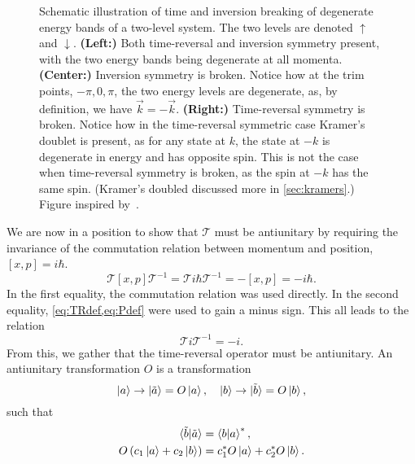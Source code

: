 \begin{figure}[h]
  \caption{Schematic illustration of time and inversion breaking of degenerate energy bands of a two-level system.
    The  two levels are denoted $\uparrow$ and $\downarrow$.
    \textbf{(Left:)} Both time-reversal and inversion symmetry present, with the two energy bands being degenerate at all momenta.
    \textbf{(Center:)} Inversion symmetry is broken. Notice how at the \gls{trim} points, $-\pi, 0, \pi$, the two energy levels are degenerate, as, by definition, we have $\vec{k} = -\vec{k}$.
    \textbf{(Right:)} Time-reversal symmetry is broken.
    Notice how in the time-reversal symmetric case Kramer's doublet is present, as for any state at $k$, the state at $-k$ is degenerate  in energy and has opposite spin.
    This is not the case when time-reversal symmetry is broken, as the spin at  $-k$ has the same spin.
    (Kramer's doubled discussed more in \cref{sec:kramers}.)
    Figure inspired by~\textcite{ramazashviliZeemanSpinorbitCoupling2019}.
  }
  \label{fig:symmetry_considerations}
\end{figure}

We are now in a position to show that $\mathcal{T}$ must be antiunitary by requiring the invariance of the commutation relation between momentum and position, $[x, p] = i\hbar$.
\begin{equation}
  \mathcal{T} [x, p] \mathcal{T}^{-1} = \mathcal{T} i\hbar \mathcal{T}^{-1} = - [x, p] = -i\hbar.
\end{equation}
In the first equality, the commutation relation was used directly.
In the second equality, \cref{eq:TRdef,eq:Pdef} were used to gain a minus sign.
This all leads to the relation
\begin{equation}
  \mathcal{T} i \mathcal{T}^{-1} = -i.
\end{equation}
From this, we gather that the time-reversal operator must be antiunitary.
An antiunitary transformation \( O \) is a transformation
$$
\ket{a} \rightarrow \ket{\tilde{a}} = O \ket{a}, \quad
\ket{b} \rightarrow \ket{\tilde{b}} = O \ket{b},
$$
such that
\begin{align}
  \braket{\tilde{b} | \tilde{a}} &= \braket{b | a}^*,\\
  O\left(c_1 \ket{a} + c_2 \ket{b}\right) &= c_1^* O\ket{a} + c_2^* O\ket{b}.
\end{align}

